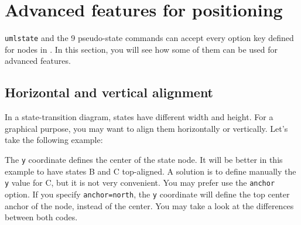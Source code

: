 \documentclass[a4paper,11pt]{report}
\begin{document}
\medskip\section{Advanced features for positioning}\label{s.stdiagadvfeat}

{\tt umlstate} and the 9 pseudo-state commands can accept every option key defined for nodes in \TikZ.
In this section, you will see how some of them can be used for advanced features.

\subsection{Horizontal and vertical alignment}\label{ss.stdiaghvalign}

In a state-transition diagram, states have different width and height. For a graphical purpose, you may want to align them horizontally or vertically. Let's take the following example:

\medskip

\begin{minipage}{0.5\textwidth}

\end{minipage}
\begin{minipage}{0.5\textwidth}
\begin{center}
\end{center}
\end{minipage}

\medskip

The {\tt y} coordinate defines the center of the state node. It will be better in this example to have states B and C top-aligned. A solution is to define manually the {\tt y} value for C, but it is not very convenient. You may prefer use the {\tt anchor} option. If you specify {\tt anchor=north}, the {\tt y} coordinate will define the top center anchor of the node, instead of the center. You may take a look at the differences between both codes.

\medskip

\begin{minipage}{0.5\textwidth}

\end{minipage}
\begin{minipage}{0.5\textwidth}
\begin{center}
\end{center}
\end{minipage}

\medskip
\end{document}
